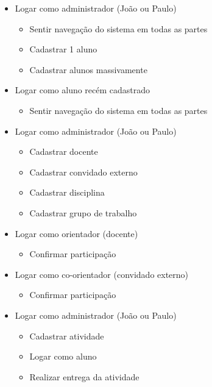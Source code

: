 \begin{itemize}
    \item Logar como administrador (João ou Paulo)
    \begin{itemize}
        \item Sentir navegação do sistema em todas as partes
        \item Cadastrar 1 aluno
        \item Cadastrar alunos massivamente        
    \end{itemize}

    \item Logar como aluno recém cadastrado
    \begin{itemize}
        \item Sentir navegação do sistema em todas as partes
    \end{itemize}

    \item Logar como administrador (João ou Paulo)
    \begin{itemize}
        \item Cadastrar docente
        \item Cadastrar convidado externo
        \item Cadastrar disciplina
        \item Cadastrar grupo de trabalho
    \end{itemize}

    \item Logar como orientador (docente)
    \begin{itemize}
        \item Confirmar participação
    \end{itemize}

    \item Logar como co-orientador (convidado externo)
    \begin{itemize}
        \item Confirmar participação
    \end{itemize}

    \item Logar como administrador (João ou Paulo)
    \begin{itemize}
        \item Cadastrar atividade
        \item Logar como aluno
        \item Realizar entrega da atividade
    \end{itemize}


\end{itemize}
